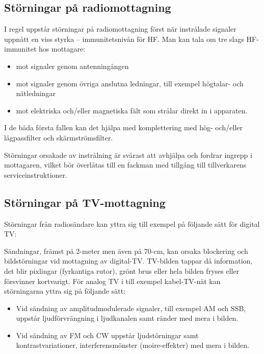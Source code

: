 \subsection{Störningar på radiomottagning}

I regel uppstår störningar på radiomottagning först när instrålade signaler
uppnått en viss styrka -- immunitetsnivån för HF.
Man kan tala om tre slags HF-immunitet hos mottagare:

\begin{itemize}
\item mot signaler genom antenningången
\item mot signaler genom övriga anslutna ledningar, till exempel högtalar-
  och nätledningar
\item mot elektriska och/eller magnetiska fält som strålar direkt in i
  apparaten.
\end{itemize}

I de båda första fallen kan det hjälpa med komplettering med hög- och/eller
lågpassfilter och skärmströmsfilter.

Störningar orsakade av instrålning är svårast att avhjälpa och fordrar ingrepp i
mottagaren, vilket bör överlåtas till en fackman med tillgång till
tillverkarens serviceinstruktioner.

\subsection{Störningar på TV-mottagning}

Störningar från radiosändare kan yttra sig till exempel på följande sätt för
digital TV:

Sändningar, främst på 2-meter men även på 70-cm, kan orsaka blockering och
bildstörningar vid mottagning av digital-TV.
TV-bilden tappar då information, det blir pixlingar (fyrkantiga rutor), grönt
brus eller hela bilden fryses eller försvinner kortvarigt.
För analog TV i till exempel kabel-TV-nät kan störningarna yttra sig på
följande sätt:

\begin{itemize}
\item Vid sändning av amplitudmodulerade signaler, till exempel AM och SSB,
  uppstår ljudförvrängning i ljudkanalen samt ränder med mera i bilden.
\item Vid sändning av FM och CW uppstår ljudstörningar samt
  kontrastvariationer, interferensmönster (moire-effekter) med mera i bilden.
\end{itemize}

